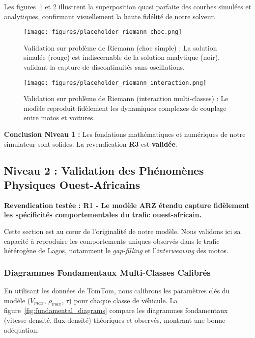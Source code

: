 Les figures~\ref{fig:riemann_choc_simple_revised} et \ref{fig:riemann_interaction_multiclasse_revised} illustrent la superposition quasi parfaite des courbes simulées et analytiques, confirmant visuellement la haute fidélité de notre solveur.

\begin{figure}[htbp]
    \centering
    \texttt{[image: figures/placeholder\_riemann\_choc.png]}
    \caption{Validation sur problème de Riemann (choc simple) : La solution simulée (rouge) est indiscernable de la solution analytique (noir), validant la capture de discontinuités sans oscillations.}
    \label{fig:riemann_choc_simple_revised}
\end{figure}

\begin{figure}[htbp]
    \centering
    \texttt{[image: figures/placeholder\_riemann\_interaction.png]}
    \caption{Validation sur problème de Riemann (interaction multi-classes) : Le modèle reproduit fidèlement les dynamiques complexes de couplage entre motos et voitures.}
    \label{fig:riemann_interaction_multiclasse_revised}
\end{figure}

\textbf{Conclusion Niveau 1 :} Les fondations mathématiques et numériques de notre simulateur sont solides. La revendication \textbf{R3} est \textbf{validée}.


\subsection{Niveau 2 : Validation des Phénomènes Physiques Ouest-Africains}
\label{sec:validation_physique}

\textbf{Revendication testée : R1 - Le modèle ARZ étendu capture fidèlement les spécificités comportementales du trafic ouest-africain.}

Cette section est au cœur de l'originalité de notre modèle. Nous validons ici sa capacité à reproduire les comportements uniques observés dans le trafic hétérogène de Lagos, notamment le \textit{gap-filling} et l'\textit{interweaving} des motos.

\subsubsection{Diagrammes Fondamentaux Multi-Classes Calibrés}
\label{subsec:diagrammes_fondamentaux}

En utilisant les données de TomTom, nous calibrons les paramètres clés du modèle ($V_{max}$, $\rho_{max}$, $\tau$) pour chaque classe de véhicule. La figure~\ref{fig:fundamental_diagrams} compare les diagrammes fondamentaux (vitesse-densité, flux-densité) théoriques et observés, montrant une bonne adéquation.

